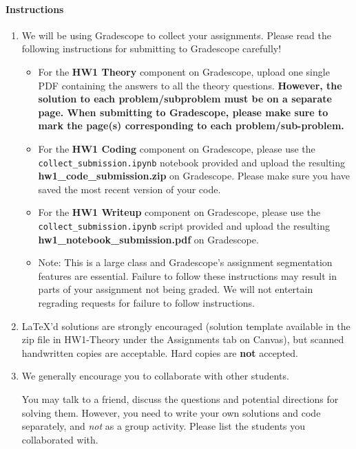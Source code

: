\documentclass[11pt,english]{article}
\begin{document}
\paragraph*{Instructions}
\begin{enumerate}
\item We will be using Gradescope to collect your assignments.  Please read the following instructions for submitting to Gradescope carefully!
     \begin{itemize}
          \item
               For the \textbf{HW1 Theory} component on Gradescope, upload one single PDF containing the answers to all the theory questions. \textbf{However, the solution to each problem/subproblem must be on a separate page. When submitting to Gradescope, please make sure to mark the page(s) corresponding to each problem/sub-problem.}
          \item
               For the \textbf{HW1 Coding} component on Gradescope, please use the \texttt{collect\_submission.ipynb} notebook provided and upload the resulting \textbf{hw1\_code\_submission.zip} on Gradescope. Please make sure you have saved the most recent version of your code.
          \item
               For the \textbf{HW1 Writeup} component on Gradescope, please use the \texttt{collect\_submission.ipynb} script provided and upload the resulting \textbf{hw1\_notebook\_submission.pdf} on Gradescope.
          \item
               Note: This is a large class and Gradescope's assignment segmentation features are essential.
               Failure to follow these instructions may result in parts of your assignment not being graded.
               We will not entertain regrading requests for failure to follow instructions.

     \end{itemize}

\item
     \LaTeX'd solutions are strongly encouraged (solution template
     available in the zip file in HW1-Theory under the Assignments tab on Canvas), but scanned handwritten copies are acceptable. Hard copies are \textbf{not} accepted.


\item We generally encourage you to collaborate with other students.

You may talk to a friend,
discuss the questions and potential directions for solving them. However, you need to write
your own solutions and code separately, and \emph{not} as a group activity.
Please list the students you collaborated with. \\ \\

\end{enumerate}
\newpage
\end{document}
